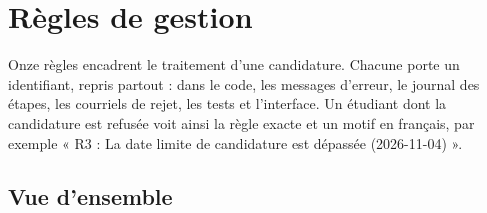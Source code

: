 \chapter{Règles de gestion}\label{chap:regles}

Onze règles encadrent le traitement d'une candidature. Chacune porte un identifiant, repris partout : dans le code, les messages d'erreur, le journal des étapes, les courriels de rejet, les tests et l'interface. Un étudiant dont la candidature est refusée voit ainsi la règle exacte et un motif en français, par exemple « R3 : La date limite de candidature est dépassée (2026-11-04) ».

\section{Vue d'ensemble}

